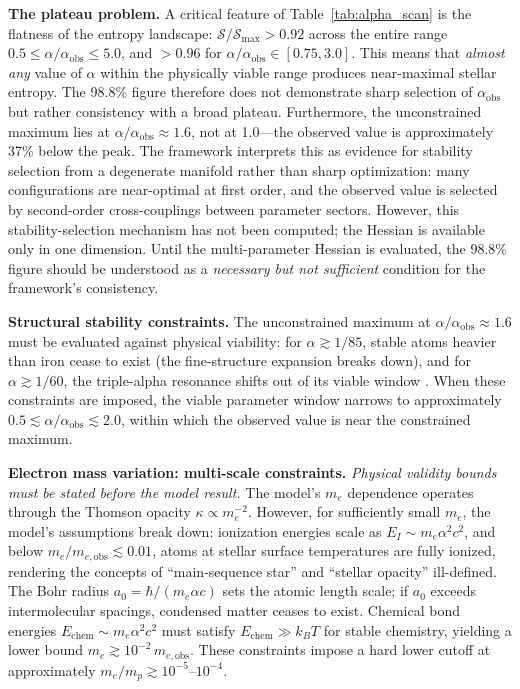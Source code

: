 \documentclass[12pt,a4paper]{article}
\theoremstyle{remark}
\begin{document}
\textbf{The plateau problem.} A critical feature of Table~\ref{tab:alpha_scan} is the flatness of the entropy landscape: $\mathcal{S}/\mathcal{S}_{\max} > 0.92$ across the entire range $0.5 \leq \alpha/\alpha_{\text{obs}} \leq 5.0$, and $> 0.96$ for $\alpha/\alpha_{\text{obs}} \in [0.75, 3.0]$. This means that \emph{almost any} value of $\alpha$ within the physically viable range produces near-maximal stellar entropy. The 98.8\% figure therefore does not demonstrate sharp selection of $\alpha_{\text{obs}}$ but rather consistency with a broad plateau. Furthermore, the unconstrained maximum lies at $\alpha/\alpha_{\text{obs}} \approx 1.6$, not at 1.0---the observed value is approximately 37\% below the peak. The framework interprets this as evidence for stability selection from a degenerate manifold rather than sharp optimization: many configurations are near-optimal at first order, and the observed value is selected by second-order cross-couplings between parameter sectors. However, this stability-selection mechanism has not been computed; the Hessian is available only in one dimension. Until the multi-parameter Hessian is evaluated, the 98.8\% figure should be understood as a \emph{necessary but not sufficient} condition for the framework's consistency.

\textbf{Structural stability constraints.} The unconstrained maximum at $\alpha / \alpha_{\text{obs}} \approx 1.6$ must be evaluated against physical viability: for $\alpha \gtrsim 1/85$, stable atoms heavier than iron cease to exist (the fine-structure expansion breaks down), and for $\alpha \gtrsim 1/60$, the triple-alpha resonance shifts out of its viable window \citep{Adams2019}. When these constraints are imposed, the viable parameter window narrows to approximately $0.5 \lesssim \alpha/\alpha_{\text{obs}} \lesssim 2.0$, within which the observed value is near the constrained maximum.

\textbf{Electron mass variation: multi-scale constraints.} \emph{Physical validity bounds must be stated before the model result.} The model's $m_e$ dependence operates through the Thomson opacity $\kappa \propto m_e^{-2}$. However, for sufficiently small $m_e$, the model's assumptions break down: ionization energies scale as $E_I \sim m_e \alpha^2 c^2$, and below $m_e/m_{e,\text{obs}} \lesssim 0.01$, atoms at stellar surface temperatures are fully ionized, rendering the concepts of ``main-sequence star'' and ``stellar opacity'' ill-defined. The Bohr radius $a_0 = \hbar/(m_e \alpha c)$ sets the atomic length scale; if $a_0$ exceeds intermolecular spacings, condensed matter ceases to exist. Chemical bond energies $E_{\text{chem}} \sim m_e \alpha^2 c^2$ must satisfy $E_{\text{chem}} \gg k_B T$ for stable chemistry, yielding a lower bound $m_e \gtrsim 10^{-2}\,m_{e,\text{obs}}$. These constraints impose a hard lower cutoff at approximately $m_e/m_p \gtrsim 10^{-5}$--$10^{-4}$.
\end{document}

